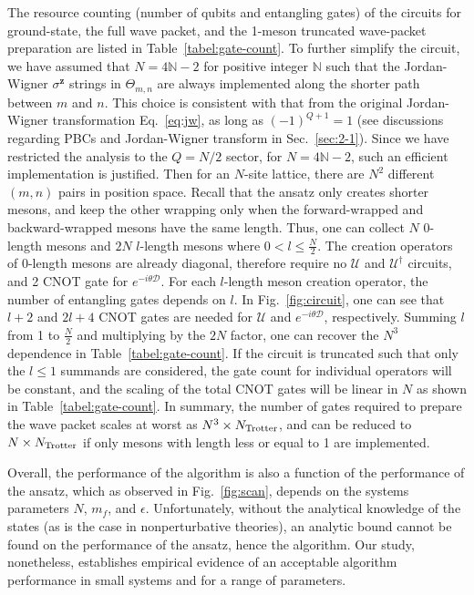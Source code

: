 \documentclass[a4paper,onecolumn,11pt,accepted=2024-10-11]{quantumarticle}
\begin{document}
The resource counting (number of qubits and entangling gates) of the circuits for ground-state, the full wave packet, and the 1-meson truncated wave-packet preparation are listed in Table~\ref{tabel:gate-count}. 
To further simplify the circuit, we have assumed that $N=4\mathbb{N}-2$ for positive integer $\mathbb{N}$ such that the Jordan-Wigner $\sigma^\textbf{z}$ strings in $\Theta_{m,n}$ are always implemented along the shorter path between $m$ and $n$. This choice is consistent with that from the original Jordan-Wigner transformation Eq.~\eqref{eq:jw}, as long as $(-1)^{Q+1}=1$ (see discussions regarding PBCs and Jordan-Wigner transform in Sec.~\ref{sec:2-1}). Since we have restricted the analysis to the $Q=N/2$ sector, for $N=4\mathbb{N}-2$, such an efficient implementation is justified.
Then for an $N$-site lattice, there are $N^2$ different $(m,n)$ pairs in position space. Recall that the ansatz only creates shorter mesons, and keep the other wrapping only when the forward-wrapped and backward-wrapped mesons have the same length. Thus, one can collect $N$ 0-length mesons and $2N$ $l$-length mesons where $0<l\leq\frac{N}{2}$. The creation operators of 0-length mesons are already diagonal, therefore require no $\mathcal{U}$ and $\mathcal{U}^\dagger$ circuits, and 2 CNOT gate for $e^{-i\theta\mathcal{D}}$. For each $l$-length meson creation operator, the number of entangling gates depends on $l$. In Fig.~\ref{fig:circuit}, one can see that $l+2$ and $2l+4$ CNOT gates are needed for $\mathcal{U}$ and $e^{-i\theta\mathcal{D}}$, respectively. Summing $l$ from 1 to $\frac{N}{2}$ and multiplying by the $2N$ factor, one can recover the $N^3$ dependence in Table~\ref{tabel:gate-count}. 
If the circuit is truncated such that only the $l\leq1$ summands are considered, the gate count for individual operators will be constant, and the scaling of the total CNOT gates will be linear in $N$ as shown in Table~\ref{tabel:gate-count}. In summary, the number of gates required to prepare the wave packet scales at worst as $N^3\times N_{\rm Trotter}$, and can be reduced to $N\times N_{\rm Trotter}$ if only mesons with length less or equal to 1 are implemented.

Overall, the performance of the algorithm is also a function of the performance of the ansatz, which as observed in Fig.~\ref{fig:scan}, depends on the systems parameters $N$, $m_f$, and $\epsilon$. Unfortunately, without the analytical knowledge of the states (as is the case in nonperturbative theories), an analytic bound cannot be found on the performance of the ansatz, hence the algorithm. Our study, nonetheless, establishes empirical evidence of an acceptable algorithm performance in small systems and for a range of parameters.
\end{document}
